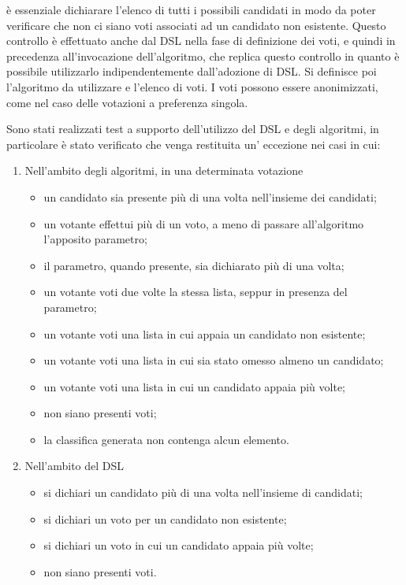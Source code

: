 \documentclass[12pt,a4paper,openright,twoside]{book}
\begin{document}
è essenziale dichiarare l'elenco di tutti i possibili candidati in modo da poter verificare che non ci siano voti associati ad un candidato non esistente.
Questo controllo è effettuato anche dal DSL nella fase di definizione dei voti, e quindi in precedenza all'invocazione dell'algoritmo,
che replica questo controllo in quanto è possibile utilizzarlo indipendentemente dall'adozione di DSL.
Si definisce poi l'algoritmo da utilizzare e l'elenco di voti. 
I voti possono essere anonimizzati, come nel caso delle votazioni a preferenza singola.


Sono stati realizzati test a supporto dell'utilizzo del DSL e degli algoritmi, in particolare è stato verificato che venga 
restituita un' eccezione nei casi in cui: 
\begin{enumerate}
    \item{Nell'ambito degli algoritmi, in una determinata votazione
        \begin{itemize}
        \item{un candidato sia presente più di una volta nell'insieme dei candidati;}
        \item{un votante effettui più di un voto, a meno di passare all'algoritmo l'apposito parametro;}
        \item{il parametro, quando presente, sia dichiarato più di una volta;}
        \item{un votante voti due volte la stessa lista, seppur in presenza del parametro;}
        \item{un votante voti una lista in cui appaia un candidato non esistente;}
        \item{un votante voti una lista in cui sia stato omesso almeno un candidato;}
        \item{un votante voti una lista in cui un candidato appaia più volte;}
        \item{non siano presenti voti;}
        \item{la classifica generata non contenga alcun elemento.}
       \end{itemize}}
    \item{Nell'ambito del DSL
        \begin{itemize}
            \item{si dichiari un candidato più di una volta nell'insieme di candidati;}
            \item{si dichiari un voto per un candidato non esistente;}
            \item{si dichiari un voto in cui un candidato appaia più volte;}
            \item{non siano presenti voti.}
        \end{itemize}
    }

\end{enumerate}
\end{document}

